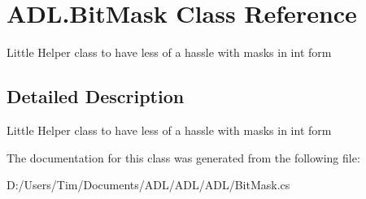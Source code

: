 \hypertarget{class_a_d_l_1_1_bit_mask}{}\section{A\+D\+L.\+Bit\+Mask Class Reference}
\label{class_a_d_l_1_1_bit_mask}


Little Helper class to have less of a hassle with masks in int form  




\subsection{Detailed Description}
Little Helper class to have less of a hassle with masks in int form 



The documentation for this class was generated from the following file\+:\begin{DoxyCompactItemize}
\item 
D\+:/\+Users/\+Tim/\+Documents/\+A\+D\+L/\+A\+D\+L/\+A\+D\+L/Bit\+Mask.\+cs\end{DoxyCompactItemize}
